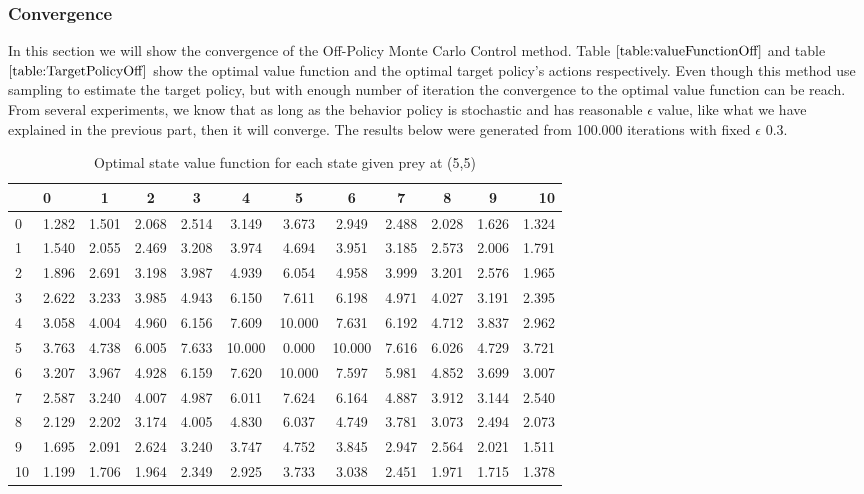 \documentclass[paper=a4, fontsize=11pt]{scrartcl}
\numberwithin{equation}{section}		%
\numberwithin{figure}{section}			%
\numberwithin{table}{section}				%
\begin{document}
\subsubsection*{Convergence}
In this section we will show the convergence of the Off-Policy Monte Carlo Control method. Table $\ref{table:valueFunctionOff}$ and table $\ref{table:TargetPolicyOff}$ show the optimal value function and the optimal target policy's actions respectively. Even though this method use sampling to estimate the target policy, but with enough number of iteration the convergence to the optimal value function can be reach. From several experiments, we know that as long as the behavior policy is stochastic and has reasonable $\epsilon$ value, like what we have explained in the previous part, then it will converge. The results below were generated from 100.000 iterations with fixed $\epsilon$ 0.3.

\begin{table}[H]
\caption{Optimal state value function for each state given prey at (5,5)}
\centering
\begin{tabular}{l|l*{9}{c}r}
  \hline
 & 0 & 1 & 2 & 3 & 4 & 5 & 6 & 7 & 8 & 9 & 10 \\ \hline 
0&1.282 & 1.501 & 2.068 & 2.514 & 3.149 & 3.673 & 2.949 & 2.488 & 2.028 & 1.626 & 1.324 \\
1&1.540 & 2.055 & 2.469 & 3.208 & 3.974 & 4.694 & 3.951 & 3.185 & 2.573 & 2.006 & 1.791 \\
2&1.896 & 2.691 & 3.198 & 3.987 & 4.939 & 6.054 & 4.958 & 3.999 & 3.201 & 2.576 & 1.965 \\
3&2.622 & 3.233 & 3.985 & 4.943 & 6.150 & 7.611 & 6.198 & 4.971 & 4.027 & 3.191 & 2.395 \\
4&3.058 & 4.004 & 4.960 & 6.156 & 7.609 & 10.000 & 7.631 & 6.192 & 4.712 & 3.837 & 2.962\\ 
5&3.763 & 4.738 & 6.005 & 7.633 & 10.000 & 0.000 & 10.000 & 7.616 & 6.026 & 4.729 & 3.721 \\ 
6&3.207 & 3.967 & 4.928 & 6.159 & 7.620 & 10.000 & 7.597 & 5.981 & 4.852 & 3.699 & 3.007 \\
7&2.587 & 3.240 & 4.007 & 4.987 & 6.011 & 7.624 & 6.164 & 4.887 & 3.912 & 3.144 & 2.540 \\
8&2.129 & 2.202 & 3.174 & 4.005 & 4.830 & 6.037 & 4.749 & 3.781 & 3.073 & 2.494 & 2.073 \\
9&1.695 & 2.091 & 2.624 & 3.240 & 3.747 & 4.752 & 3.845 & 2.947 & 2.564 & 2.021 & 1.511 \\
10&1.199 & 1.706 & 1.964 & 2.349 & 2.925 & 3.733 & 3.038 & 2.451 & 1.971 & 1.715 & 1.378 
\end{tabular}
\label{table:valueFunctionOff}
\end{table}
\end{document}
